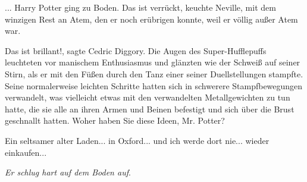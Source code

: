 ... Harry Potter ging zu Boden. \glqq Das ist verrückt\grqq{}, keuchte Neville,
mit dem winzigen Rest an Atem, den er noch erübrigen konnte, weil er völlig
außer Atem war.

\glqq Das ist brillant!\grqq{}, sagte Cedric Diggory. Die Augen des
Super-Hufflepuffs leuchteten vor manischem Enthusiasmus und glänzten wie der
Schweiß auf seiner Stirn, als er mit den Füßen durch den Tanz einer seiner
Duellstellungen stampfte. Seine normalerweise leichten Schritte hatten sich in
schwerere Stampfbewegungen verwandelt, was vielleicht etwas mit den verwandelten
Metallgewichten zu tun hatte, die sie alle an ihren Armen und Beinen befestigt
und sich über die Brust geschnallt hatten. \glqq Woher haben Sie diese Ideen,
Mr. Potter?\grqq{}

\glqq Ein seltsamer alter Laden... in Oxford... und ich werde dort nie... wieder
einkaufen...\grqq{}

\emph{Er schlug hart auf dem Boden auf}.

